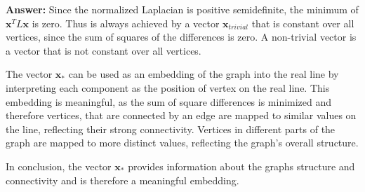 \documentclass{article}
\begin{document}
\begin{multicols}{2}
    \textbf{Answer:}
    Since the normalized Laplacian is positive semidefinite, the minimum of \( \mathbf{x}^T L \mathbf{x} \) is zero. Thus is always achieved by a vector \( \mathbf{x}_{trivial}\) that is constant over all vertices, since the sum of squares of the differences is zero. A non-trivial vector is a vector that is not constant over all vertices.\par
    The vector \( \mathbf{x}_* \) can be used as an embedding of the graph into the real line by interpreting each component as the position of vertex on the real line. This embedding is meaningful, as the sum of square differences is minimized and therefore vertices, that are connected by an edge are mapped to similar values on the line, reflecting their strong connectivity. Vertices in different parts of the graph are mapped to more distinct values, reflecting the graph's overall structure.\par
    In conclusion, the vector \( \mathbf{x}_* \) provides information about the graphs structure and connectivity and is therefore a meaningful embedding.




\end{multicols}

\clearpage
\end{document}
